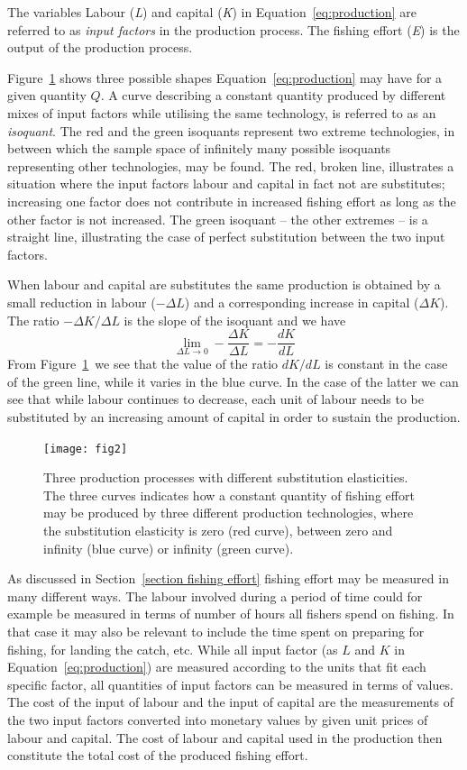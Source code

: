 \documentclass[11pt,fleqn]{book} %
\begin{document}
The variables Labour (\textit{L}) and capital (\textit{K}) in Equation~\ref{eq:production} are referred to as \textit{input factors} in the production process. The fishing effort (\textit{E}) is the output of the production process.

Figure~\ref{fig:production} shows three possible shapes Equation~\ref{eq:production} may have for a given quantity $Q$. A curve describing a constant quantity produced by different mixes of input factors while utilising the same technology, is referred to as an \textit{isoquant}. The red and the green isoquants represent two extreme technologies, in between which the sample space of infinitely many possible isoquants representing other technologies, may be found. The red, broken line, illustrates a situation where the input factors labour and capital in fact not are substitutes; increasing one factor does not contribute in increased fishing effort as long as the other factor is not increased. The green isoquant -- the other extremes -- is a straight line, illustrating the case of perfect substitution between the two input factors.

When labour and capital are substitutes the same production is obtained by a small reduction in labour ($-\Delta L$) and a corresponding increase in capital ($\Delta K$). The ratio $- \Delta K / \Delta L$ is the slope of the isoquant and we have
\begin{equation*} 
\lim_{\Delta L \to 0} -\frac{\Delta K}{\Delta L} = -\frac{dK}{dL}
\end{equation*}
From Figure~\ref{fig:production}~we see that the value of the ratio $dK/dL$ is constant in the case of the green line, while it varies in the blue curve. In the case of the latter we can see that while labour continues to decrease, each unit of labour needs to be substituted by an increasing amount of capital in order to sustain the production. 
\begin{figure}[ht]
\centering\texttt{[image: fig2]}
\caption{Three production processes with different substitution elasticities. The three curves indicates how a constant quantity of fishing effort may be produced by three different production technologies, where the substitution elasticity is zero (red curve), between zero and infinity (blue curve) or infinity (green curve).}
\label{fig:production}
\end{figure}

As discussed in Section~\ref{section fishing effort} fishing effort may be measured in many different ways. The labour involved during a period of time could for example be measured in terms of number of hours all fishers spend on fishing. In that case it may also be relevant to include the time spent on preparing for fishing, for landing the catch, etc. While all input factor (as $L$ and $K$ in Equation~\ref{eq:production}) are measured according to the units that fit each specific factor, all quantities of input factors can be measured in terms of values. The cost of the input of labour and the input of capital are the measurements of the two input factors converted into monetary values by given unit prices of labour and capital. The cost of labour and capital used in the production then constitute the total cost of the produced fishing effort.
\end{document}

